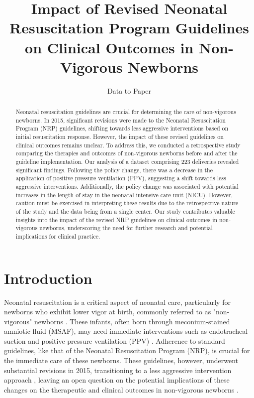 \documentclass[11pt]{article}
\title{Impact of Revised Neonatal Resuscitation Program Guidelines on Clinical Outcomes in Non-Vigorous Newborns}
\author{Data to Paper}
\begin{document}
\maketitle
\begin{abstract}Neonatal resuscitation guidelines are crucial for determining the care of non-vigorous newborns. In 2015, significant revisions were made to the Neonatal Resuscitation Program (NRP) guidelines, shifting towards less aggressive interventions based on initial resuscitation response. However, the impact of these revised guidelines on clinical outcomes remains unclear. To address this, we conducted a retrospective study comparing the therapies and outcomes of non-vigorous newborns before and after the guideline implementation. Our analysis of a dataset comprising 223 deliveries revealed significant findings. Following the policy change, there was a decrease in the application of positive pressure ventilation (PPV), suggesting a shift towards less aggressive interventions. Additionally, the policy change was associated with potential increases in the length of stay in the neonatal intensive care unit (NICU). However, caution must be exercised in interpreting these results due to the retrospective nature of the study and the data being from a single center. Our study contributes valuable insights into the impact of the revised NRP guidelines on clinical outcomes in non-vigorous newborns, underscoring the need for further research and potential implications for clinical practice.\end{abstract}
\section*{Introduction}

Neonatal resuscitation is a critical aspect of neonatal care, particularly for newborns who exhibit lower vigor at birth, commonly referred to as "non-vigorous" newborns \cite{Wyckoff2015Part1N}. These infants, often born through meconium-stained amniotic fluid (MSAF), may need immediate interventions such as endotracheal suction and positive pressure ventilation (PPV) \cite{Chawla2020PerinatalNeonatalMO}. Adherence to standard guidelines, like that of the Neonatal Resuscitation Program (NRP), is crucial for the immediate care of these newborns. These guidelines, however, underwent substantial revisions in 2015, transitioning to a less aggressive intervention approach \cite{Wyckoff2015Part1N}, leaving an open question on the potential implications of these changes on the therapeutic and clinical outcomes in non-vigorous newborns \cite{Myers2020ImpactOT}.
\end{document}
